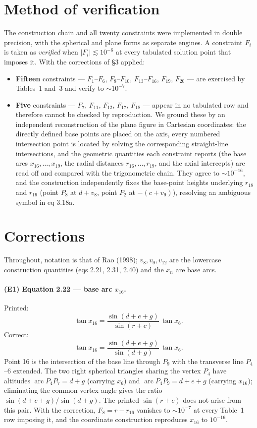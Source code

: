\documentclass[11pt]{article}
\begin{document}
\section{Method of verification}
The construction chain and all twenty constraints were implemented in double
precision, with the spherical and plane forms as separate engines. A constraint $F_i$ is taken as \emph{verified} when $|F_i|\lesssim 10^{-6}$ at every tabulated solution point that imposes it. With the corrections of \S3 applied:
\begin{itemize}
\item \textbf{Fifteen} constraints --- $F_1$--$F_6$, $F_8$--$F_{10}$,
$F_{13}$--$F_{16}$, $F_{19}$, $F_{20}$ --- are exercised by Tables~1 and~3 and
verify to ${\sim}10^{-7}$.
\item \textbf{Five} constraints --- $F_7$, $F_{11}$, $F_{12}$, $F_{17}$,
$F_{18}$ --- appear in no tabulated row and therefore cannot be checked by reproduction. We ground these by an independent reconstruction of the plane figure in Cartesian coordinates: the directly defined base points are placed on the axis, every numbered intersection point is located by solving the corresponding straight-line intersections, and the geometric quantities each constraint reports (the base arcs $x_{16},\dots,x_{19}$, the radial distances $r_{16},\dots,r_{19}$, and the axial intercepts) are read off and compared with the trigonometric chain. They agree to ${\sim}10^{-16}$, and the construction independently fixes the base-point heights underlying $r_{18}$ and $r_{19}$ (point $P_8$ at $d+v_8$, point $P_2$ at $-(c+v_9)$), resolving an ambiguous symbol in eq 3.18a.
\end{itemize}

\section{Corrections}
Throughout, notation is that of Rao (1998); $v_8,v_9,v_{12}$ are the lowercase construction quantities (eqs 2.21, 2.31, 2.40) and the $x_n$ are base arcs.

\paragraph{(E1) Equation 2.22 --- base arc $x_{16}$.}
Printed:
\[ \tan x_{16} = \frac{\sin(d+e+g)}{\sin(r+c)}\,\tan x_6. \]
Correct:
\[ \boxed{\;\tan x_{16} = \frac{\sin(d+e+g)}{\sin(d+g)}\,\tan x_6.\;} \]
Point 16 is the intersection of the base line through $P_9$ with the transverse line $P_4$--6 extended. The two right spherical triangles sharing the vertex $P_4$ have altitudes $\operatorname{arc}P_4P_7 = d+g$ (carrying $x_6$) and $\operatorname{arc}P_4P_9 = d+e+g$ (carrying $x_{16}$); eliminating the common vertex angle gives the ratio $\sin(d+e+g)/\sin(d+g)$. The printed $\sin(r+c)$ does not arise from this pair. With the correction, $F_8 = r - r_{16}$ vanishes to ${\sim}10^{-7}$ at every Table~1 row imposing it, and the coordinate construction reproduces $x_{16}$ to $10^{-16}$.
\end{document}
